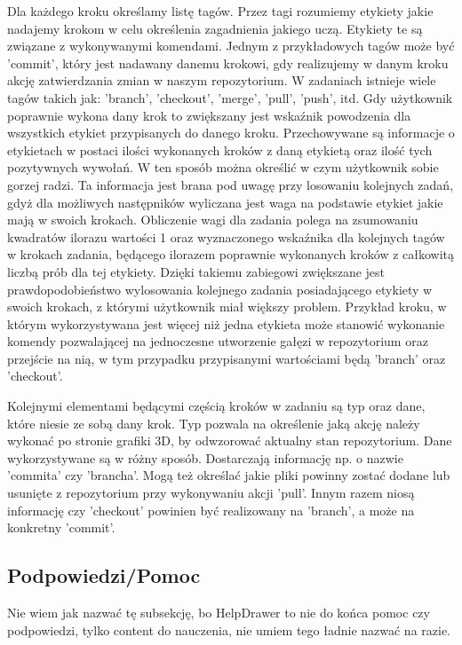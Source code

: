 \documentclass[11pt,a4paper,polish,thesis]{dcsbook}
\begin{document}
 Dla każdego kroku określamy listę tagów. Przez tagi rozumiemy etykiety jakie nadajemy krokom w celu określenia zagadnienia jakiego uczą. Etykiety te są związane z wykonywanymi komendami. Jednym z przykładowych tagów może być 'commit', który jest nadawany danemu krokowi, gdy realizujemy w danym kroku akcję zatwierdzania zmian w naszym repozytorium. W zadaniach istnieje wiele tagów takich jak: 'branch', 'checkout', 'merge', 'pull', 'push', itd.  Gdy użytkownik poprawnie wykona dany krok to zwiększany jest wskaźnik powodzenia dla wszystkich etykiet przypisanych do danego kroku. Przechowywane są informacje o etykietach w postaci ilości wykonanych kroków z daną etykietą oraz ilość tych pozytywnych wywołań. W ten sposób można określić w czym użytkownik sobie gorzej radzi. Ta informacja jest brana pod uwagę przy losowaniu kolejnych zadań, gdyż dla możliwych następników wyliczana jest waga na podstawie etykiet jakie mają w swoich krokach. Obliczenie wagi dla zadania polega na zsumowaniu kwadratów ilorazu wartości 1 oraz wyznaczonego wskaźnika dla kolejnych tagów w krokach zadania, będącego ilorazem poprawnie wykonanych kroków z całkowitą liczbą prób dla tej etykiety. Dzięki takiemu zabiegowi zwiększane jest prawdopodobieństwo wylosowania kolejnego zadania posiadającego etykiety w swoich krokach, z którymi użytkownik miał większy problem. Przykład kroku, w którym wykorzystywana jest więcej niż jedna etykieta może stanowić wykonanie komendy pozwalającej na jednoczesne utworzenie gałęzi w repozytorium oraz przejście na nią, w tym przypadku przypisanymi wartościami będą 'branch' oraz 'checkout'. 

	Kolejnymi elementami będącymi częścią kroków w zadaniu są typ oraz dane, które niesie ze sobą dany krok. Typ pozwala na określenie jaką akcję należy wykonać po stronie grafiki 3D, by odwzorować aktualny stan repozytorium. Dane wykorzystywane są w różny sposób. Dostarczają informację np. o nazwie 'commita' czy 'brancha'. Mogą też określać jakie pliki powinny zostać dodane lub usunięte z repozytorium przy wykonywaniu akcji 'pull'. Innym razem niosą informację czy 'checkout' powinien być realizowany na 'branch', a może na konkretny 'commit'. 
	
	\subsection{Podpowiedzi/Pomoc}
	Nie wiem jak nazwać tę subsekcję, bo HelpDrawer to nie do końca pomoc czy podpowiedzi, tylko content do nauczenia, nie umiem tego ładnie nazwać na razie.
	
\end{document}
